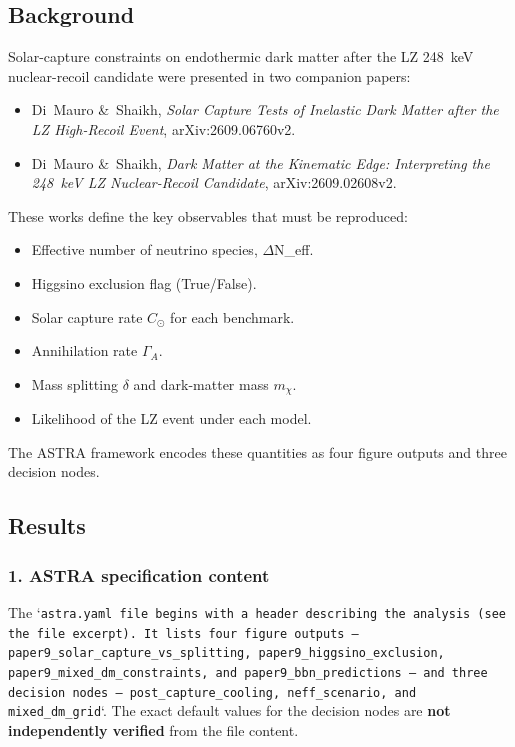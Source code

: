 \documentclass[11pt,a4paper]{article}
\begin{document}
\subsection{Background}
Solar-capture constraints on endothermic dark matter after the LZ 248~keV nuclear-recoil candidate were presented in two companion papers:

\begin{itemize}
  \item Di~Mauro \&~Shaikh, \textit{Solar Capture Tests of Inelastic Dark Matter after the LZ High-Recoil Event}, arXiv:2609.06760v2.
  \item Di~Mauro \&~Shaikh, \textit{Dark Matter at the Kinematic Edge: Interpreting the 248~keV LZ Nuclear-Recoil Candidate}, arXiv:2609.02608v2.
\end{itemize}
These works define the key observables that must be reproduced:

\begin{itemize}
  \item Effective number of neutrino species, $\Delta$N\_eff.
  \item Higgsino exclusion flag (True/False).
  \item Solar capture rate $C_{\odot}$ for each benchmark.
  \item Annihilation rate $\Gamma_{A}$.
  \item Mass splitting $\delta$ and dark-matter mass $m_{\chi}$.
  \item Likelihood of the LZ event under each model.
\end{itemize}
The ASTRA framework encodes these quantities as four figure outputs and three decision nodes.

\subsection{Results}
\subsubsection{1. ASTRA specification content}
The `\texttt{astra.yaml}\texttt{ file begins with a header describing the analysis (see the file excerpt)\allowbreak{}. It lists four figure outputs -- }\texttt{paper9\_\allowbreak{}solar\_\allowbreak{}capture\_\allowbreak{}vs\_\allowbreak{}splitting}\texttt{,\allowbreak{} }\texttt{paper9\_\allowbreak{}higgsino\_\allowbreak{}exclusion}\texttt{,\allowbreak{} }\texttt{paper9\_\allowbreak{}mixed\_\allowbreak{}dm\_\allowbreak{}constraints}\texttt{,\allowbreak{} and }\texttt{paper9\_\allowbreak{}bbn\_\allowbreak{}predictions}\texttt{ -- and three decision nodes -- }\texttt{post\_\allowbreak{}capture\_\allowbreak{}cooling}\texttt{,\allowbreak{} }\texttt{neff\_\allowbreak{}scenario}\texttt{,\allowbreak{} and }\texttt{mixed\_\allowbreak{}dm\_\allowbreak{}grid}`. The exact default values for the decision nodes are \textbf{not independently verified} from the file content.
\end{document}
